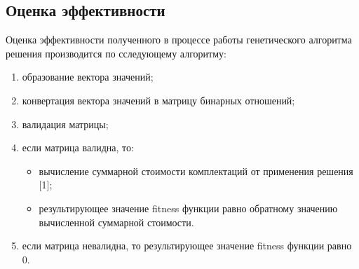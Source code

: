 \subsection*{Оценка эффективности}
Оценка эффективности полученного в процессе работы генетического алгоритма решения производится по сследующему алгоритму:
\begin{enumerate}
  \item образование вектора значений;
  \item конвертация вектора значений в матрицу бинарных отношений;
  \item валидация матрицы;
  \item если матрица валидна, то:
  \begin{itemize}
    \item вычисление суммарной стоимости комплектаций от применения решения [1];
    \item результирующее значение fitness функции равно обратному значению вычисленной суммарной стоимости.
  \end{itemize}
  \item если матрица невалидна, то результирующее значение fitness функции равно $0$.
\end{enumerate}
